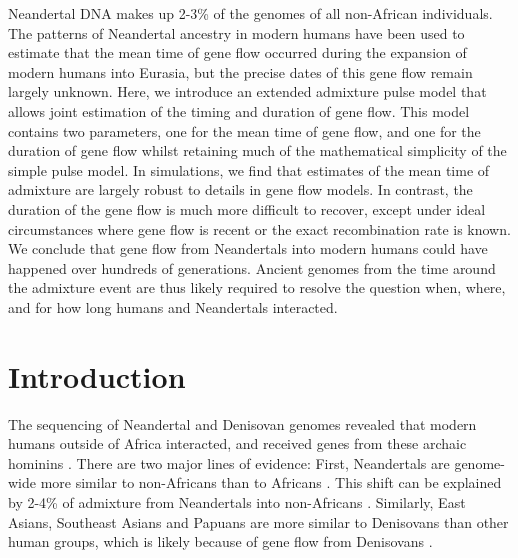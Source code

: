 \documentclass[11pt]{article}
\begin{document}
Neandertal DNA makes up 2-3\% of the genomes of all non-African individuals. The patterns of Neandertal ancestry in modern humans have been used to estimate that the mean time of gene flow occurred during the expansion of modern humans into Eurasia, but the precise dates of this gene flow remain largely unknown. Here, we introduce an extended admixture pulse model that allows joint estimation of the timing and duration of gene flow. This model contains two parameters, one for the mean time of gene flow, and one for the duration of gene flow whilst retaining much of the mathematical simplicity of the simple pulse model. In simulations, we find that estimates of the mean time of admixture are largely robust to details in gene flow models. In contrast, the duration of the gene flow is much more difficult to recover, except under ideal circumstances where gene flow is recent or the exact recombination rate is known. We conclude that gene flow from Neandertals into modern humans could have happened over hundreds of generations. Ancient genomes from the time around the admixture event are thus likely required to resolve the question when, where, and for how long humans and Neandertals interacted.

\section{Introduction}\label{sec:introduction}

The sequencing of Neandertal  \citep{green_draft_2010,prufer_complete_2013,prufer_high-coverage_2017, mafessoni_high_coverage_2020} and Denisovan genomes \citep{reich_genetic_2010, meyer_high-coverage_2012} revealed that modern humans outside of Africa interacted, and received genes from these archaic hominins \citep{vernot_resurrecting_2014,fu_genome_2014,sankararaman_genomic_2014,fu_early_2015,malaspinas_genomic_2016,sankararaman_combined_2016,vernot_excavating_2016}. There are two major lines of evidence: First, Neandertals are genome-wide more similar to non-Africans than to Africans \citep{green_draft_2010}. This shift can be explained by 2-4\% of admixture from Neandertals into non-Africans \citep{green_draft_2010, prufer_complete_2013}. Similarly, East Asians, Southeast Asians and Papuans are more similar to Denisovans than other human groups, which is likely because of gene flow from Denisovans \citep{meyer_high-coverage_2012}. 
\end{document}
